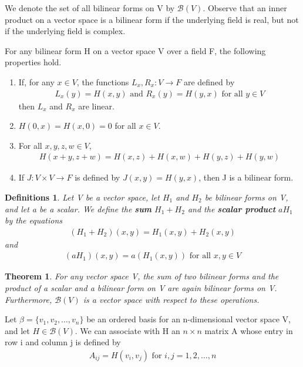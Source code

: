 \documentclass{article}
\newcommand{\bd}[1]{\textbf{#1}}
\theoremstyle{plain}
\newtheorem{theorem}{Theorem}[section]
\newtheorem*{definitions}{Definitions}
\theoremstyle{plain} %
\begin{document}
We denote the set of all bilinear forms on V by $\mathcal B(V)$. Observe that an inner product on a vector space is a bilinear form if the underlying field is real, but not if the underlying field is complex.

For any bilinear form H on a vector space V over a field F, the following properties hold.

\begin{enumerate}
  \item If, for any $x \in V$, the functions $L_x, R_x : V \to F$ are defined by
  \begin{align*}
    L_x(y) = H(x, y)\text{ and }R_x(y) = H(y, x)\text{ for all }y \in V
  \end{align*}
  then $L_x$ and $R_x$ are linear.
  \item $H(0, x) = H(x, 0) = 0$ for all $x \in V$.
  \item For all $x, y, z, w \in V$,
  \begin{align*}
    H(x + y, z + w) = H(x, z) + H(x, w) + H(y, z) + H(y, w)
  \end{align*}
  \item If $J : V \times V \to F$ is defined by $J(x, y) = H(y, x)$, then J is a bilinear form.
\end{enumerate}

\begin{definitions}
  Let V be a vector space, let $H_1$ and $H_2$ be bilinear forms on V, and let a be a scalar. We define the \bd{sum} $H_1 + H_2$ and the \bd{scalar product} $aH_1$ by the equations
  \begin{align*}
    (H_1 + H_2)(x, y) = H_1(x, y) + H_2(x, y)
  \end{align*}
  and
  \begin{align*}
    (aH_1)(x, y) = a(H_1(x, y))\text{ for all }x, y \in V
  \end{align*}
\end{definitions}

\begin{theorem}
  For any vector space V, the sum of two bilinear forms and the product of a scalar and a bilinear form on V are again bilinear forms on V. Furthermore, $\mathcal B(V)$ is a vector space with respect to these operations.
\end{theorem}

Let $\beta = \{v_1, v_2, \ldots , v_n\}$ be an ordered basis for an n-dimensional vector space V, and let $H \in \mathcal B(V)$. We can associate with H an $n \times n$ matrix A whose entry in row i and column j is defined by
\begin{align*}
  A_{ij} = H(v_i, v_j)\text{ for }i,j = 1,2,\ldots,n
\end{align*}
\end{document}
